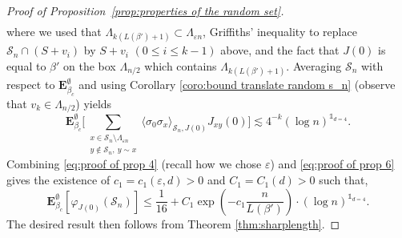 \documentclass[11pt,a4paper]{article}
\numberwithin{equation}{section}
\theoremstyle{plain}
\theoremstyle{definition}
\begin{document}
\begin{proof}[Proof of Proposition~\textup{\ref{prop:properties of the random set}}]
\begin{multline}
		\end{multline}
	where we used that $\Lambda_{k(L(\beta')+1)}\subset \Lambda_{\varepsilon n}$, Griffiths' inequality to replace $\mathcal S_n\cap (S+v_i)$ by $S+v_i$ $(0\leq i \leq k-1)$ above, and the fact that $J(0)$ is equal to $\beta'$ on the box $\Lambda_{n/2}$ which contains $\Lambda_{k(L(\beta')+1)}$. Averaging $\mathcal S_n$ with respect to $\mathbf E^\emptyset_{\beta_c}$ and using Corollary \ref{coro:bound translate random s_n} (observe that $v_k\in \Lambda_{n/2}$) yields
	\begin{equation}\label{eq:proof of prop 6}
		\mathbf E_{\beta_c}^{\emptyset}\Big[\sum_{\substack{x\in \mathcal S_n\setminus\Lambda_{\varepsilon n}\\y\notin \mathcal S_n, \: y\sim x}}\langle \sigma_0\sigma_x\rangle_{\mathcal S_n,J(0)}J_{xy}(0)\Big]\lesssim 4^{-k} (\log n)^{\mathds{1}_{d=4}}.
	\end{equation}
	Combining \eqref{eq:proof of prop 4} (recall how we chose $\varepsilon$) and \eqref{eq:proof of prop 6} gives the existence of $c_1=c_1(\varepsilon,d)>0$ and $C_1=C_1(d)>0$ such that,
	\begin{equation}
		\mathbf E_{\beta_c}^\emptyset[\varphi_{J(0)}(\mathcal S_n)]\leq \frac{1}{16}+C_1\exp\left(-c_1\frac{n}{L(\beta')}\right)\cdot (\log n)^{\mathds{1}_{d=4}}.
	\end{equation}
	The desired result then follows from Theorem \ref{thm:sharplength}.
	\end{proof}
\end{document}
